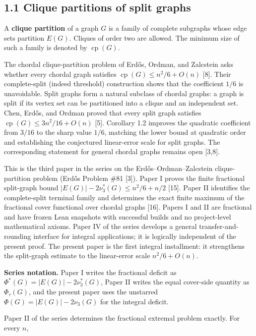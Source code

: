 \documentclass[
  american,
  11pt,
  a4paper,
]{article}
\begin{document}
\subsection{1.1 Clique partitions of split graphs}\label{clique-partitions-of-split-graphs}

A \textbf{clique partition} of a graph \(G\) is a family of complete subgraphs whose edge sets partition \(E(G)\). Cliques of order two are allowed. The minimum size of such a family is denoted by \(\operatorname{cp}(G)\).

The chordal clique-partition problem of Erdős, Ordman, and Zalcstein asks whether every chordal graph satisfies \(\operatorname{cp}(G)\le n^2/6+O(n)\) {[}8{]}. Their complete-split (indeed threshold) construction shows that the coefficient \(1/6\) is unavoidable. Split graphs form a natural subclass of chordal graphs: a graph is split if its vertex set can be partitioned into a clique and an independent set. Chen, Erdős, and Ordman proved that every split graph satisfies \(\operatorname{cp}(G)\le 3n^2/16+O(n)\) {[}5{]}. Corollary 1.2 improves the quadratic coefficient from \(3/16\) to the sharp value \(1/6\), matching the lower bound at quadratic order and establishing the conjectured linear-error scale for split graphs. The corresponding statement for general chordal graphs remains open {[}3,8{]}.

This is the third paper in the series on the Erdős--Ordman--Zalcstein clique-partition problem (Erdős Problem \#81 {[}3{]}). Paper I proves the finite fractional split-graph bound \(|E(G)|-2\nu_3^*(G)\le n^2/6+n/2\) {[}15{]}. Paper II identifies the complete-split terminal family and determines the exact finite maximum of the fractional cover functional over chordal graphs {[}16{]}. Papers I and II are fractional and have frozen Lean snapshots with successful builds and no project-level mathematical axioms. Paper IV of the series develops a general transfer-and-rounding interface for integral applications; it is logically independent of the present proof. The present paper is the first integral installment: it strengthens the split-graph estimate to the linear-error scale \(n^2/6+O(n)\).

\textbf{Series notation.} Paper I writes the fractional deficit as \(\Phi^*(G)=|E(G)|-2\nu_3^*(G)\), Paper II writes the equal cover-side quantity as \(\Phi_\tau(G)\), and the present paper uses the unstarred \(\Phi(G)=|E(G)|-2\nu_3(G)\) for the integral deficit.

Paper II of the series determines the fractional extremal problem exactly. For every \(n\),
\end{document}
